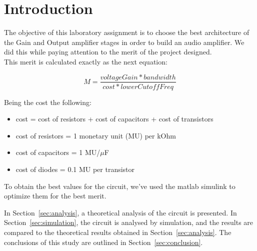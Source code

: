 \newpage
\section{Introduction}
\label{sec:introduction}

The objective of this laboratory assignment is to choose the best architecture of the Gain and Output amplifier
stages in order to build an audio amplifier. We did this while paying attention to the merit of the project designed.\\
This merit is calculated exactly as the next equation:

\begin{equation} 
M = \frac{voltageGain*bandwidth}{cost*lowerCutoffFreq}
\label{eq1}
\end{equation}

Being the cost the following:
\begin{itemize}
	\item cost = cost of resistors  + cost of capacitors + cost of transistors
	\item cost of resistors = 1 monetary unit (MU) per kOhm
	\item cost of capacitors = 1 MU/$\mu$F
	\item cost of diodes = 0.1 MU per transistor
	
\end{itemize}

%

To obtain the best values for the circuit, we've used the matlab simulink to optimize them for the best merit.

In Section~\ref{sec:analysis}, a theoretical analysis of the circuit is
presented. In Section~\ref{sec:simulation}, the circuit is analysed by
simulation, and the results are compared to the theoretical results obtained in
Section~\ref{sec:analysis}. The conclusions of this study are outlined in
Section~\ref{sec:conclusion}. \\


